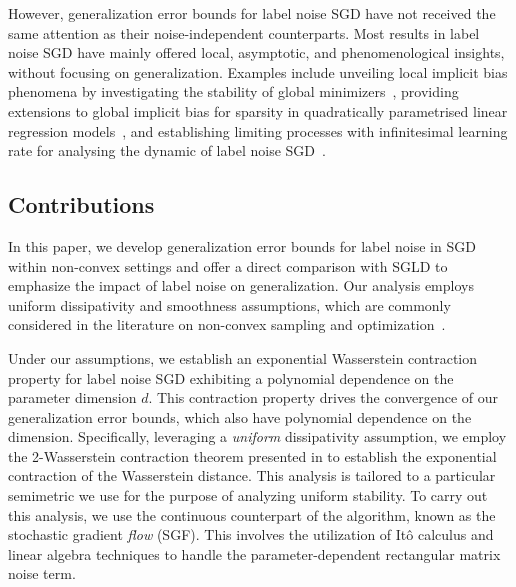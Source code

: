 \documentclass{article}
\begin{document}
However, generalization error bounds for label noise SGD have not received the same attention as their noise-independent counterparts. Most results in label noise SGD have mainly offered local, asymptotic, and phenomenological insights, without focusing on generalization. Examples include unveiling local implicit bias phenomena by investigating the stability of global minimizers~\citep{Blanc}, providing extensions to global implicit bias for sparsity in quadratically parametrised linear regression models~\citep{Haochen, Damian}, and establishing limiting processes with infinitesimal learning rate for analysing the dynamic of label noise SGD~\citep{li2022happens, Pillaud-Vivien}. 


\subsection{Contributions}

In this paper, we develop generalization error bounds for label noise in SGD within non-convex settings and offer a direct comparison with SGLD to emphasize the impact of label noise on generalization. Our analysis employs uniform dissipativity and smoothness assumptions, which are commonly considered in the literature on non-convex sampling and optimization~\citep{Eberle, Raginsky, Xu2, Erdogdu, zhang, Chau, Farghly}.

Under our assumptions, we establish an exponential Wasserstein contraction property for label noise SGD exhibiting a polynomial dependence on the parameter dimension $d$. This contraction property drives the convergence of our generalization error bounds, which also have polynomial dependence on the dimension. Specifically, leveraging a \emph{uniform} dissipativity assumption, we employ the 2-Wasserstein contraction theorem presented in \citet{Wang} to establish the exponential contraction of the Wasserstein distance. This analysis is tailored to a particular semimetric we use for the purpose of analyzing uniform stability. To carry out this analysis, we use the continuous counterpart of the algorithm, known as the stochastic gradient \emph{flow} (SGF). This involves the utilization of Itô calculus and linear algebra techniques to handle the parameter-dependent rectangular matrix noise term.
\end{document}
